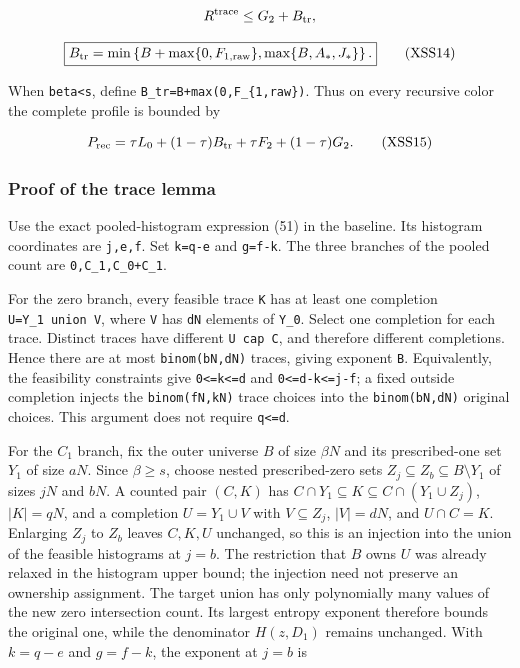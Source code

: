 \[
R^{\rm trace}\le G_2+B_{\rm tr},
\]

\[
\boxed{B_{\rm tr}=
 \min\left\{B+\max\{0,F_{1,\rm raw}\},
             \max\{B,A_*,J_*\}\right\}.}
 \tag{XSS14}
\]

When \texttt{beta\textless{}s}, define \texttt{B\_tr=B+max(0,F\_\{1,raw\})}. Thus on every recursive color the complete profile is bounded by

\[
P_{\rm rec}=\tau L_0+(1-\tau)B_{\rm tr}
              +\tau F_2+(1-\tau)G_2.
 \tag{XSS15}
\]

\hypertarget{af-a9ec399514-proof-of-the-trace-lemma}{%
\subsubsection{Proof of the trace lemma}\label{af-a9ec399514-proof-of-the-trace-lemma}}

Use the exact pooled-histogram expression (51) in the baseline. Its histogram coordinates are \texttt{j,e,f}. Set \texttt{k=q-e} and \texttt{g=f-k}. The three branches of the pooled count are \texttt{0,C\_1,C\_0+C\_1}.

For the zero branch, every feasible trace \texttt{K} has at least one completion \texttt{U=Y\_1\ union\ V}, where \texttt{V} has \texttt{dN} elements of \texttt{Y\_0}. Select one completion for each trace. Distinct traces have different \texttt{U\ cap\ C}, and therefore different completions. Hence there are at most \texttt{binom(bN,dN)} traces, giving exponent \texttt{B}. Equivalently, the feasibility constraints give \texttt{0\textless{}=k\textless{}=d} and \texttt{0\textless{}=d-k\textless{}=j-f}; a fixed outside completion injects the \texttt{binom(fN,kN)} trace choices into the \texttt{binom(bN,dN)} original choices. This argument does not require \texttt{q\textless{}=d}.

For the \(C_1\) branch, fix the outer universe \(B\) of size \(\beta N\) and its prescribed-one set \(Y_1\) of size \(aN\). Since \(\beta\ge s\), choose nested prescribed-zero sets \(Z_j\subseteq Z_b\subseteq B\setminus Y_1\) of sizes \(jN\) and \(bN\). A counted pair \((C,K)\) has \(C\cap Y_1\subseteq K\subseteq C\cap(Y_1\cup Z_j)\), \(|K|=qN\), and a completion \(U=Y_1\cup V\) with \(V\subseteq Z_j\), \(|V|=dN\), and \(U\cap C=K\). Enlarging \(Z_j\) to \(Z_b\) leaves \(C,K,U\) unchanged, so this is an injection into the union of the feasible histograms at \(j=b\). The restriction that \(B\) owns \(U\) was already relaxed in the histogram upper bound; the injection need not preserve an ownership assignment. The target union has only polynomially many values of the new zero intersection count. Its largest entropy exponent therefore bounds the original one, while the denominator \(H(z,D_1)\) remains unchanged. With \(k=q-e\) and \(g=f-k\), the exponent at \(j=b\) is

